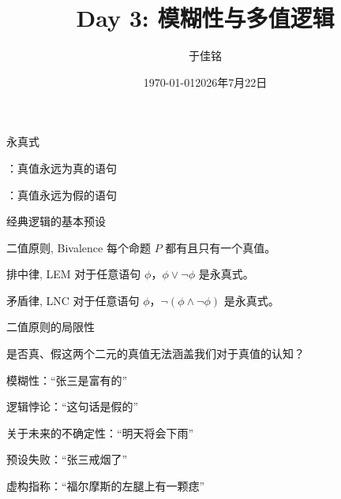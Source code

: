 \documentclass{zhslides}
\title{Day 3: 模糊性与多值逻辑}
\subtitle{}
\date{\today}
\date{2026年7月22日}
\author{于佳铭}
\institute{唯理书院2026\\「精确的逻辑与模糊的意义」} %
\begin{document}
\maketitle




\begin{frame}{永真式}

  \bit
    \item {}：真值永远为真的语句
    \item {}：真值永远为假的语句
  \eit

\end{frame}


\begin{frame}{经典逻辑的基本预设}

  \begin{law*}{二值原则, Bivalence}
    每个命题 $P$ 都有且只有一个真值。
  \end{law*}
  \pause

  \begin{law*}{排中律, LEM}
    对于任意语句 $\phi$，$\phi \lor \neg \phi$ 是永真式。
  \end{law*}
  \pause

  \begin{law*}{矛盾律, LNC}
    对于任意语句 $\phi$，$\neg(\phi \land \neg \phi)$ 是永真式。
  \end{law*}
  

\end{frame}


\begin{frame}[t]{二值原则的局限性}
  
  \vspace{2em}
  \begin{brainstorm*}{}
    是否真、假这两个二元的真值无法涵盖我们对于真值的认知？
  \end{brainstorm*}
  \vspace{1em}
  
  \pause
  \bit
    \item 模糊性：“张三是富有的”
    \item 逻辑悖论：“这句话是假的”
    \item 关于未来的不确定性：“明天将会下雨”
    \item 预设失败：“张三戒烟了”
    \item 虚构指称：“福尔摩斯的左腿上有一颗痣”
  \eit

\end{frame}
\end{document}
